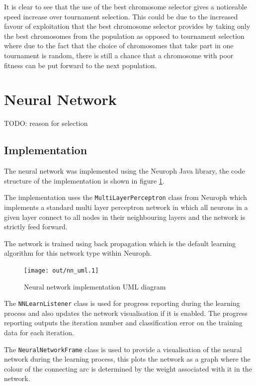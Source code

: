 \documentclass[a4paper]{article}
\begin{document}
It is clear to see that the use of the best chromosome selector gives a
noticeable speed increase over tournament selection. This could be due to the
increased favour of exploitation that the best chromosome selector provides by
taking only the best chromosomes from the population as opposed to tournament
selection where due to the fact that the choice of chromosomes that take part in
one tournament is random, there is still a chance that a chromosome with poor
fitness can be put forward to the next population.

\section{Neural Network}
\label{sec:nn}

TODO: reason for selection

\subsection{Implementation}
\label{sec:nn_implementation}

The neural network was implemented using the Neuroph \cite{neuroph} Java
library, the code structure of the implementation is shown in figure
\ref{fig:nn_uml}.

The implementation uses the \texttt{MultiLayerPerceptron} class from Neuroph
which implements a standard multi layer perceptron network in which all neurons
in a given layer connect to all nodes in their neighbouring layers and the
network is strictly feed forward.

The network is trained using back propagation which is the default learning
algorithm for this network type within Neuroph.

\begin{figure}[h!]
  \centering
  \texttt{[image: out/nn\_uml.1]}
  \caption{Neural network implementation UML diagram}
  \label{fig:nn_uml}
\end{figure}

The \texttt{NNLearnListener} class is used for progress reporting during the
learning process and also updates the network visualisation if it is enabled.
The progress reporting outputs the iteration number and classification error on
the training data for each iteration.

The \texttt{NeuralNetworkFrame} class is used to provide a visualisation of the
neural network during the learning process, this plots the network as a graph
where the colour of the connecting arc is determined by the weight associated
with it in the network.
\end{document}

